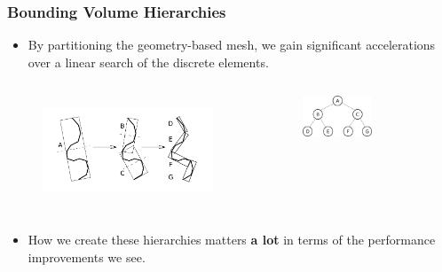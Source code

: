 \documentclass[12pt]{beamer}
\begin{document}
\begin{frame}[allowpagebreak,T]
\frametitle{Bounding Volume Hierarchies}

\begin{itemize}
  \item By partitioning the geometry-based mesh, we gain significant accelerations over a linear search of the discrete elements.
\end{itemize}


\begin{columns}
  
  \begin{figure}
    \centering
    \includegraphics[width=1\textwidth]{./images/bvh_2d_ex_w_labels.png} 
    \cite{gottschalk1996obbtree}
  \end{figure}
  
  \begin{figure}
    \includegraphics[width=0.6\textwidth]{./images/binary_graph.png}
  \end{figure}
  
\end{columns}


\begin{itemize}
  \item How we create these hierarchies matters \textbf{a lot} in terms of the performance improvements we see.
\end{itemize}

\end{frame}
\end{document}

